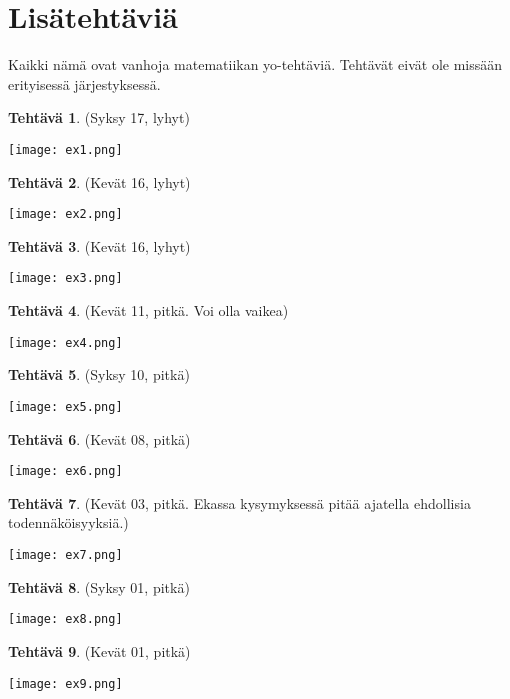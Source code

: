 \documentclass[12pt,leqno,a4paper,oneside]{amsart}
\theoremstyle{definition}
\newtheorem{exercise}{Tehtävä}
\theoremstyle{remark}
\numberwithin{equation}{section}
\begin{document}
\newpage
\section{Lisätehtäviä}

Kaikki nämä ovat vanhoja matematiikan yo-tehtäviä. Tehtävät eivät ole missään erityisessä järjestyksessä.

\begin{exercise}
 (Syksy 17, lyhyt)
 
 \texttt{[image: ex1.png]}
\end{exercise}


\begin{exercise}
 (Kevät 16, lyhyt)
 
 \texttt{[image: ex2.png]}
\end{exercise}

\begin{exercise}
 (Kevät 16, lyhyt)
 
 \texttt{[image: ex3.png]}
\end{exercise}

\begin{exercise}
 (Kevät 11, pitkä. Voi olla vaikea)
 
 \texttt{[image: ex4.png]}
\end{exercise}

\begin{exercise}
 (Syksy 10, pitkä)
 
 \texttt{[image: ex5.png]}
\end{exercise}


\begin{exercise}
 (Kevät 08, pitkä)
 
 \texttt{[image: ex6.png]}
\end{exercise}


\begin{exercise}
 (Kevät 03, pitkä. Ekassa kysymyksessä pitää ajatella ehdollisia todennäköisyyksiä.)
 
 \texttt{[image: ex7.png]}
\end{exercise}

\begin{exercise}
 (Syksy 01, pitkä)
 
 \texttt{[image: ex8.png]}
\end{exercise}

\begin{exercise}
 (Kevät 01, pitkä)
 
 \texttt{[image: ex9.png]}
\end{exercise}
\end{document}
